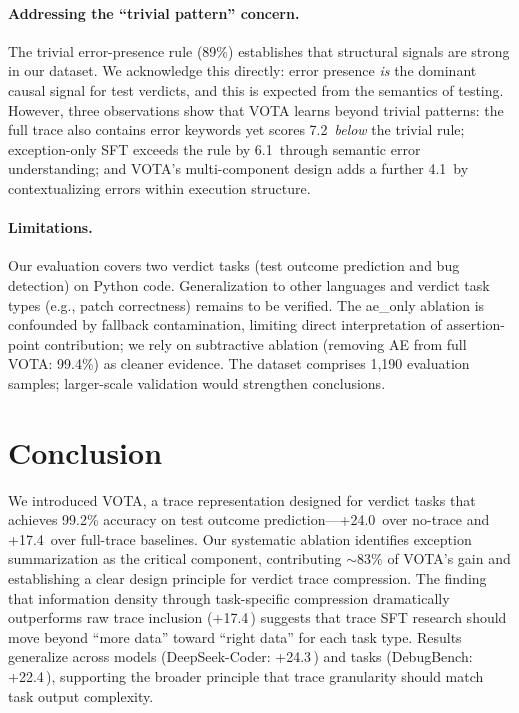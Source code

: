\documentclass[11pt]{article}
\newcommand{\vota}{\textsc{VOTA}}
\newcommand{\pp}{\,\text{pp}}
\begin{document}
\paragraph{Addressing the ``trivial pattern'' concern.}
The trivial error-presence rule (89\%) establishes that structural signals are strong in our dataset. We acknowledge this directly: error presence \emph{is} the dominant causal signal for test verdicts, and this is expected from the semantics of testing. However, three observations show that \vota{} learns beyond trivial patterns: the full trace also contains error keywords yet scores 7.2\pp{} \emph{below} the trivial rule; exception-only SFT exceeds the rule by 6.1\pp{} through semantic error understanding; and \vota{}'s multi-component design adds a further 4.1\pp{} by contextualizing errors within execution structure.

\paragraph{Limitations.}
Our evaluation covers two verdict tasks (test outcome prediction and bug detection) on Python code. Generalization to other languages and verdict task types (e.g., patch correctness) remains to be verified. The ae\_only ablation is confounded by fallback contamination, limiting direct interpretation of assertion-point contribution; we rely on subtractive ablation (removing AE from full \vota{}: 99.4\%) as cleaner evidence. The dataset comprises 1,190 evaluation samples; larger-scale validation would strengthen conclusions.

\section{Conclusion}

We introduced \vota{}, a trace representation designed for verdict tasks that achieves 99.2\% accuracy on test outcome prediction---+24.0\pp{} over no-trace and +17.4\pp{} over full-trace baselines. Our systematic ablation identifies exception summarization as the critical component, contributing ${\sim}83\%$ of \vota{}'s gain and establishing a clear design principle for verdict trace compression. The finding that information density through task-specific compression dramatically outperforms raw trace inclusion (+17.4\pp{}) suggests that trace SFT research should move beyond ``more data'' toward ``right data'' for each task type. Results generalize across models (DeepSeek-Coder: +24.3\pp{}) and tasks (DebugBench: +22.4\pp{}), supporting the broader principle that trace granularity should match task output complexity.
\end{document}
